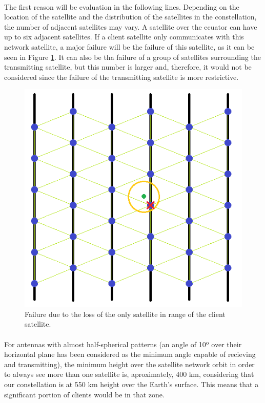 \paragraph{}The first reason will be evaluation in the following lines. Depending on the location of the satellite and the distribution of the satellites in the constellation, the number of adjacent satellites may vary. A satellite over the ecuator can have up to six adjacent satellites. If a client satellite only communicates with this network satellite, a major failure will be the failure of this satellite, as it can be seen in Figure \ref{fig:critical1}. It can also be tha failure of a group of satellites surrounding the transmitting satellite, but this number is larger and, therefore, it would not be considered since the failure of the transmitting satellite is more restrictive.
\begin{figure}[H]
\begin{center}
\includegraphics[scale=0.5]{./sections/Constellation_Deployment/S5-Spare_Strategy/critical1.png}
\caption[1 communication range failure]{Failure due to the loss of the only satellite in range of the client satellite.}
\label{fig:critical1}
\end{center}
\end{figure}
\paragraph{}For antennas with almost half-spherical patterns (an angle of 10º over their horizontal plane has been considered as the minimum angle capable of recieving and transmitting), the minimum height over the satellite network orbit in order to always see more than one satellite is, aproximately, 400 km, considering that our constellation is at 550 km height over the Earth's surface. This means that a significant portion of clients would be in that zone.

